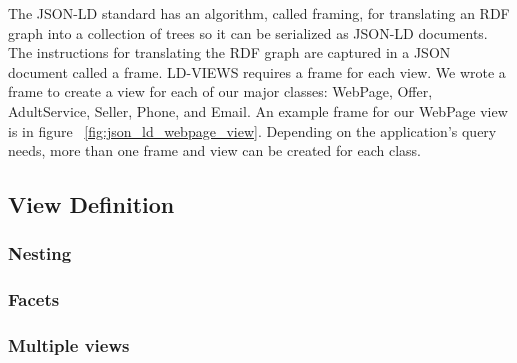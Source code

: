 The JSON-LD standard has an algorithm, called framing, for translating an RDF graph into a collection of trees so it can be serialized as JSON-LD documents. %
The instructions for translating the RDF graph are captured in a JSON document called a frame.  
LD-VIEWS requires a frame for each view.  
We wrote a frame to create a view for each of our major classes: WebPage, Offer, AdultService, Seller, Phone, and Email.  
An example frame for our WebPage view is in figure ~\ref{fig:json_ld_webpage_view}.  
Depending on the application's query needs, more than one frame and view can be created for each class.  

\subsection{View Definition}
\subsubsection{Nesting}
\subsubsection{Facets}
\subsubsection{Multiple views}

